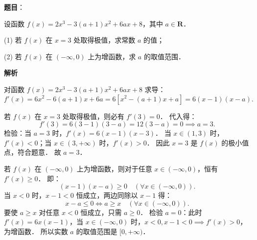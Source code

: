 \begin{answer}

\textbf{题目}：

设函数 $f(x) = 2x^3 - 3(a + 1)x^2 + 6ax + 8$，其中 $a \in \mathbf{R}$．

(1) 若 $f(x)$ 在 $x = 3$ 处取得极值，求常数 $a$ 的值；

(2) 若 $f(x)$ 在 $(-\infty, 0)$ 上为增函数，求 $a$ 的取值范围．

\textbf{解析}

对函数 $f(x) = 2x^3 - 3(a + 1)x^2 + 6ax + 8$ 求导：
\nopagebreak[4]
\[
f'(x) = 6x^2 - 6(a + 1)x + 6a = 6\left[x^2 - (a + 1)x + a\right] = 6(x - 1)(x - a).
\]


若 $f(x)$ 在 $x = 3$ 处取得极值，则必有 $f'(3) = 0$．
代入得：
\nopagebreak[4]
\[
f'(3) = 6(3 - 1)(3 - a) = 12(3 - a) = 0 \implies a = 3.
\]
检验：当 $a = 3$ 时，$f'(x) = 6(x - 1)(x - 3)$．
当 $x \in (1, 3)$ 时，$f'(x) < 0$；当 $x \in (3, +\infty)$ 时，$f'(x) > 0$．
因此 $x = 3$ 是 $f(x)$ 的极小值点，符合题意．
故 $a = 3$．


若 $f(x)$ 在 $(-\infty, 0)$ 上为增函数，则对于任意 $x \in (-\infty, 0)$，恒有 $f'(x) \geqslant 0$．
即：
\nopagebreak[4]
\[
(x - 1)(x - a) \geqslant 0 \quad (\forall x \in (-\infty, 0)).
\]
当 $x < 0$ 时，$x - 1 < 0$ 恒成立，两边同除以 $x - 1$ 得：
\nopagebreak[4]
\[
x - a \leqslant 0 \iff a \geqslant x \quad (\forall x \in (-\infty, 0)).
\]
要使 $a \geqslant x$ 对任意 $x < 0$ 恒成立，只需 $a \geqslant 0$．
检验 $a = 0$：此时 $f'(x) = 6x(x - 1)$，当 $x \in (-\infty, 0)$ 时，$x < 0, x - 1 < 0 \implies f'(x) > 0$，为增函数．
所以实数 $a$ 的取值范围是 $[0, +\infty)$．


\gkanswer{答案（2）：$[0, +\infty)$（或 $a \geqslant 0$）。}

\end{answer}
